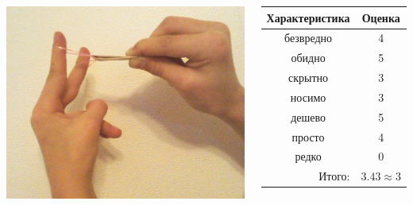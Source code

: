 \begin{frame} %
    \begin{columns}
            \begin{center}
                \includegraphics[width=\textwidth]{fig/slingshot}
            \end{center}
            
            \begin{center}
                \begin{tabular}{c|c}
                    \hline\hline
                    Характеристика              & Оценка\\ \hline\hline
                    безвредно                   & 4 \\
                    обидно                      & 5 \\
                    скрытно                     & 3 \\
                    носимо                      & 3 \\
                    дешево                      & 5 \\
                    просто                      & 4 \\ 
                    редко                       & 0 \\ \hline
                    \multicolumn{1}{r|}{Итого:} & $3.43\approx 3$ \\
                \end{tabular}
            \end{center}
    \end{columns}    
\end{frame}


